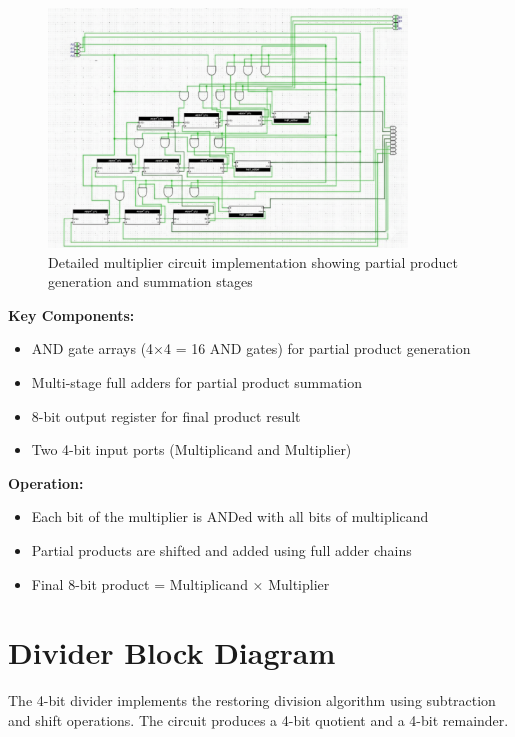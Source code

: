 \begin{figure}[h]
    \centering
    \includegraphics[width=0.85\textwidth]{multiplier-circuit}
    \caption{Detailed multiplier circuit implementation showing partial product generation and summation stages}
    \label{fig:multiplier-circuit}
\end{figure}

\textbf{Key Components:}
\begin{itemize}
    \item AND gate arrays (4×4 = 16 AND gates) for partial product generation
    \item Multi-stage full adders for partial product summation
    \item 8-bit output register for final product result
    \item Two 4-bit input ports (Multiplicand and Multiplier)
\end{itemize}

\textbf{Operation:}
\begin{itemize}
    \item Each bit of the multiplier is ANDed with all bits of multiplicand
    \item Partial products are shifted and added using full adder chains
    \item Final 8-bit product = Multiplicand × Multiplier
\end{itemize}

\section{Divider Block Diagram}

The 4-bit divider implements the restoring division algorithm using subtraction and shift operations. The circuit produces a 4-bit quotient and a 4-bit remainder.

